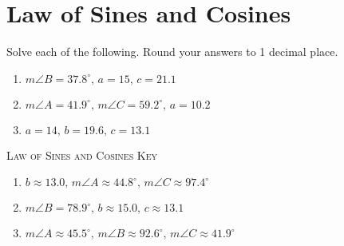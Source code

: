 \chapter{Law of Sines and Cosines}

Solve each of the following. Round your answers to 1 decimal place.

\begin{enumerate}
	\item $m\angle B = 37.8^\circ, \, a = 15, \, c = 21.1$
    \item $m\angle A = 41.9^\circ, \, m\angle C = 59.2^\circ, \, a = 10.2$
    \item $a = 14, \, b = 19.6, \, c = 13.1$
\end{enumerate}

\newpage

\textsc{Law of Sines and Cosines Key}

\begin{enumerate}
	\item $b \approx 13.0, \, m\angle A \approx 44.8^\circ, \, m\angle C \approx 97.4^\circ$
	\item $m \angle B = 78.9^\circ, \, b \approx 15.0, \, c \approx 13.1$
	\item $m\angle A \approx 45.5^\circ, \, m\angle B \approx 92.6^\circ, \, m\angle C \approx 41.9^\circ$
\end{enumerate}